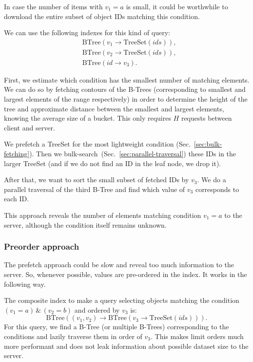\documentclass[notitlepage,longbibliography]{revtex4-1}
\begin{document}
In case the number of items with $v_1=a$ is small, it could be worthwhile to download the entire subset of object IDs matching this condition.

We can use the following indexes for this kind of query:
\begin{align*}
    & \mbox{BTree}(v_1 \rightarrow \mbox{TreeSet}(ids)),\\
    & \mbox{BTree}(v_2 \rightarrow \mbox{TreeSet}(ids)),\\
    & \mbox{BTree}(id \rightarrow v_3).
\end{align*}

First, we estimate which condition has the smallest number of matching elements.
We can do so by fetching contours of the B-Trees (corresponding to smallest and largest elements of the range respectively) in order to determine the height of the tree and approximate distance between the smallest and largest elements, knowing the average size of a bucket. This only requires $H$ requests between client and server.

We prefetch a TreeSet for the most lightweight condition (Sec.~\ref{sec:bulk-fetching}).
Then we bulk-search~(Sec.~\ref{sec:parallel-traversal}) these IDs in the larger TreeSet (and if we do not find an ID in the leaf node, we drop it).

After that, we want to sort the small subset of fetched IDs by $v_3$.
We do a parallel traversal of the third B-Tree and find which value of $v_3$ corresponds to each ID.

This approach reveals the number of elements matching condition $v_1=a$ to the server, although the condition itself remains unknown.

\subsubsection{Preorder approach}

The prefetch approach could be slow and reveal too much information to the server.
So, whenever possible, values are pre-ordered in the index.
It works in the following way.

The composite index to make a query selecting objects matching the condition $(v_1 = a) \,\&\, (v_2 = b)$ and ordered by $v_3$ is:
\begin{equation*}
    \mbox{BTree}((v_1, v_2) \rightarrow \mbox{BTree}(v_3 \rightarrow \mbox{TreeSet}(ids))).
\end{equation*}
For this query, we find a B-Tree (or multiple B-Trees) corresponding to the conditions and lazily traverse them in order of $v_3$.
This makes limit orders much more performant and does not leak information about possible dataset size to the server.
\end{document}

